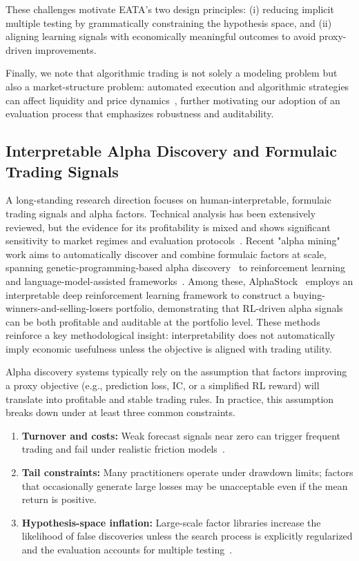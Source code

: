 These challenges motivate EATA's two design principles: (i) reducing implicit multiple testing by grammatically constraining the hypothesis space, and (ii) aligning learning signals with economically meaningful outcomes to avoid proxy-driven improvements. 

Finally, we note that algorithmic trading is not solely a modeling problem but also a market-structure problem: automated execution and algorithmic strategies can affect liquidity and price dynamics~\cite{hendershott2011does}, further motivating our adoption of an evaluation process that emphasizes robustness and auditability.

\subsection{Interpretable Alpha Discovery and Formulaic Trading Signals}

A long-standing research direction focuses on human-interpretable, formulaic trading signals and alpha factors. Technical analysis has been extensively reviewed, but the evidence for its profitability is mixed and shows significant sensitivity to market regimes and evaluation protocols~\cite{park2007we}. Recent "alpha mining" work aims to automatically discover and combine formulaic factors at scale, spanning genetic-programming-based alpha discovery~\cite{ren2024alpha} to reinforcement learning and language-model-assisted frameworks~\cite{yu2023alphagen,wang2025alpha,xu2024alphaforge}. Among these, AlphaStock~\cite{wang2022alphastock} employs an interpretable deep reinforcement learning framework to construct a buying-winners-and-selling-losers portfolio, demonstrating that RL-driven alpha signals can be both profitable and auditable at the portfolio level. These methods reinforce a key methodological insight: interpretability does not automatically imply economic usefulness unless the objective is aligned with trading utility.

Alpha discovery systems typically rely on the assumption that factors improving a proxy objective (e.g., prediction loss, IC, or a simplified RL reward) will translate into profitable and stable trading rules. In practice, this assumption breaks down under at least three common constraints.
\begin{enumerate}
    \item \textbf{Turnover and costs:} Weak forecast signals near zero can trigger frequent trading and fail under realistic friction models~\cite{keim1997transaction_costs}.
    \item \textbf{Tail constraints:} Many practitioners operate under drawdown limits; factors that occasionally generate large losses may be unacceptable even if the mean return is positive.
    \item \textbf{Hypothesis-space inflation:} Large-scale factor libraries increase the likelihood of false discoveries unless the search process is explicitly regularized and the evaluation accounts for multiple testing~\cite{white2000reality_check,harvey2016multiple_testing}.
\end{enumerate}

